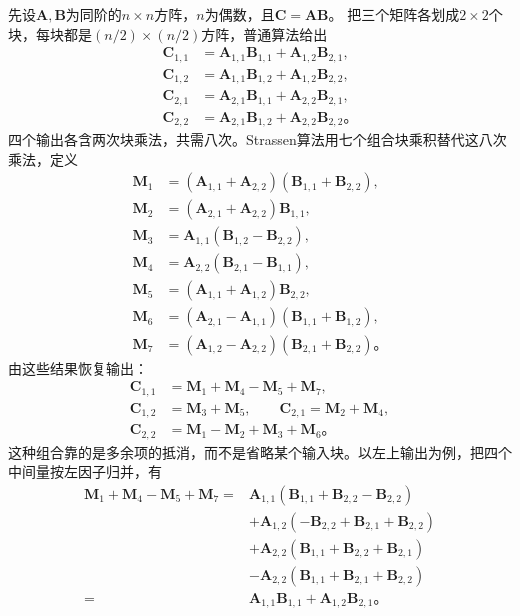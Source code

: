 先设$\bm A,\bm B$为同阶的$n\times n$方阵，$n$为偶数，且$\bm C=\bm A\bm B$。
把三个矩阵各划成$2\times2$个块，每块都是$(n/2)\times(n/2)$方阵，普通算法给出
\begin{equation}
  \begin{aligned}
    \bm C_{1,1}&=\bm A_{1,1}\bm B_{1,1}+\bm A_{1,2}\bm B_{2,1},\\
    \bm C_{1,2}&=\bm A_{1,1}\bm B_{1,2}+\bm A_{1,2}\bm B_{2,2},\\
    \bm C_{2,1}&=\bm A_{2,1}\bm B_{1,1}+\bm A_{2,2}\bm B_{2,1},\\
    \bm C_{2,2}&=\bm A_{2,1}\bm B_{1,2}+\bm A_{2,2}\bm B_{2,2}\text{。}
  \end{aligned}
  \label{eq:cnn-classical-block-product}
\end{equation}
四个输出各含两次块乘法，共需八次。Strassen算法用七个组合块乘积替代这八次乘法，定义
\begin{equation}
  \begin{aligned}
    \bm M_1&=(\bm A_{1,1}+\bm A_{2,2})(\bm B_{1,1}+\bm B_{2,2}),\\
    \bm M_2&=(\bm A_{2,1}+\bm A_{2,2})\bm B_{1,1},\\
    \bm M_3&=\bm A_{1,1}(\bm B_{1,2}-\bm B_{2,2}),\\
    \bm M_4&=\bm A_{2,2}(\bm B_{2,1}-\bm B_{1,1}),\\
    \bm M_5&=(\bm A_{1,1}+\bm A_{1,2})\bm B_{2,2},\\
    \bm M_6&=(\bm A_{2,1}-\bm A_{1,1})(\bm B_{1,1}+\bm B_{1,2}),\\
    \bm M_7&=(\bm A_{1,2}-\bm A_{2,2})(\bm B_{2,1}+\bm B_{2,2})\text{。}
  \end{aligned}
  \label{eq:cnn-strassen-products}
\end{equation}
由这些结果恢复输出：
\begin{equation}
  \begin{aligned}
    \bm C_{1,1}&=\bm M_1+\bm M_4-\bm M_5+\bm M_7,\\
    \bm C_{1,2}&=\bm M_3+\bm M_5,\qquad
    \bm C_{2,1}=\bm M_2+\bm M_4,\\
    \bm C_{2,2}&=\bm M_1-\bm M_2+\bm M_3+\bm M_6\text{。}
  \end{aligned}
  \label{eq:cnn-strassen-recovery}
\end{equation}
这种组合靠的是多余项的抵消，而不是省略某个输入块。以左上输出为例，把四个中间量按左因子归并，有
\begin{equation}
  \begin{aligned}
    \bm M_1+\bm M_4-\bm M_5+\bm M_7
    ={}&\bm A_{1,1}(\bm B_{1,1}+\bm B_{2,2}-\bm B_{2,2})\\
       &+\bm A_{1,2}(-\bm B_{2,2}+\bm B_{2,1}+\bm B_{2,2})\\
       &+\bm A_{2,2}(\bm B_{1,1}+\bm B_{2,2}+\bm B_{2,1})\\
       &-\bm A_{2,2}(\bm B_{1,1}+\bm B_{2,1}+\bm B_{2,2})\\
    ={}&\bm A_{1,1}\bm B_{1,1}+\bm A_{1,2}\bm B_{2,1}\text{。}
  \end{aligned}
  \label{eq:cnn-strassen-cancellation}
\end{equation}
